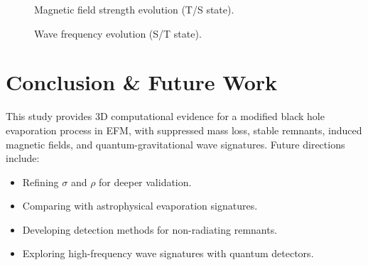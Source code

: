 \documentclass[11pt]{article}
\begin{document}
\begin{figure}[ht]
    \centering
    \caption{Magnetic field strength evolution (T/S state).}
    \label{fig:mag_field}
\end{figure}

\begin{figure}[ht]
    \centering
    \caption{Wave frequency evolution (S/T state).}
    \label{fig:wave_freq}
\end{figure}

\section{Conclusion \& Future Work}
This study provides 3D computational evidence for a modified black hole evaporation process in EFM, with suppressed mass loss, stable remnants, induced magnetic fields, and quantum-gravitational wave signatures. Future directions include:
\begin{itemize}
    \item Refining \(\sigma\) and \(\rho\) for deeper validation.
    \item Comparing with astrophysical evaporation signatures.
    \item Developing detection methods for non-radiating remnants.
    \item Exploring high-frequency wave signatures with quantum detectors.
\end{itemize}
\end{document}

